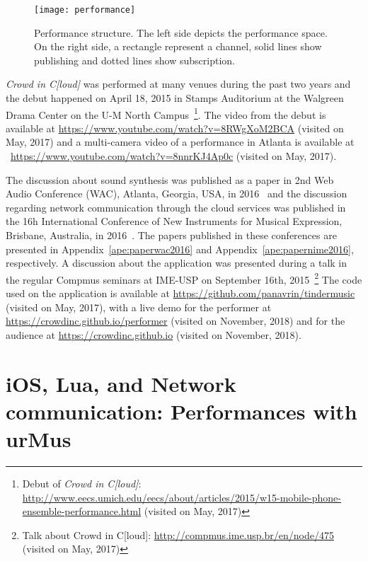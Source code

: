 \begin{figure}[t]
	\centering
	\texttt{[image: performance]}
	\caption{Performance structure. The left side depicts the performance space. On the right side, a rectangle represent a channel, solid lines show publishing and dotted lines show subscription.}
	\label{fig:performance}
\end{figure}

\textit{Crowd in C[loud]} was performed at many venues during the past two years and the debut happened on April 18, 2015 in Stamps Auditorium at the Walgreen Drama Center on the U-M North Campus~\footnote{Debut of \textit{Crowd in C[loud]}: \url{http://www.eecs.umich.edu/eecs/about/articles/2015/w15-mobile-phone-ensemble-performance.html} (visited on May, 2017)}.
The video from the debut is available at \url{https://www.youtube.com/watch?v=8RWgXoM2BCA} (visited on May, 2017) and a multi-camera video of a performance in Atlanta is available at ~\url{https://www.youtube.com/watch?v=8nnrKJ4Ap0c} (visited on May, 2017).

The discussion about sound synthesis was published as a paper in 2nd Web Audio Conference (WAC), Atlanta, Georgia,  USA, in 2016~\citep{Lee2016crowd} and the discussion regarding network communication through the cloud services was published in the 16h International Conference of New Instruments for Musical Expression, Brisbane, Australia, in 2016~\citep{deCarvalhoJunior2016understanding}.
The papers published in these conferences are presented in Appendix~\ref{ape:paperwac2016} and Appendix~\ref{ape:papernime2016}, respectively.
A discussion about the application was presented during a talk in the regular Compmus seminars at IME-USP on September 16th, 2015~\footnote{Talk about Crowd in C[loud]: \url{http://compmus.ime.usp.br/en/node/475} (visited on May, 2017)}
The code used on the application is available at \url{https://github.com/panavrin/tindermusic} (visited on May, 2017), with a live demo for the performer at \url{https://crowdinc.github.io/performer} (visited on November, 2018) and for the audience at \url{https://crowdinc.github.io} (visited on November, 2018).

\section{iOS, Lua, and Network communication: Performances with urMus}
\label{apesec:appsumich}

